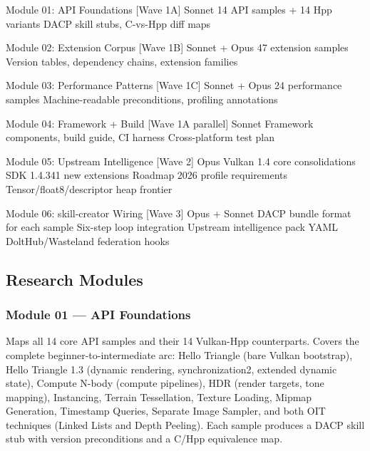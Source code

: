 \documentclass[11pt,letterpaper]{article}
\begin{document}
\begin{asciibox}
Module 01: API Foundations          [Wave 1A] Sonnet
  14 API samples + 14 Hpp variants
  DACP skill stubs, C-vs-Hpp diff maps

Module 02: Extension Corpus         [Wave 1B] Sonnet + Opus
  47 extension samples
  Version tables, dependency chains, extension families

Module 03: Performance Patterns     [Wave 1C] Sonnet + Opus
  24 performance samples
  Machine-readable preconditions, profiling annotations

Module 04: Framework + Build        [Wave 1A parallel] Sonnet
  Framework components, build guide, CI harness
  Cross-platform test plan

Module 05: Upstream Intelligence    [Wave 2] Opus
  Vulkan 1.4 core consolidations
  SDK 1.4.341 new extensions
  Roadmap 2026 profile requirements
  Tensor/float8/descriptor heap frontier

Module 06: skill-creator Wiring     [Wave 3] Opus + Sonnet
  DACP bundle format for each sample
  Six-step loop integration
  Upstream intelligence pack YAML
  DoltHub/Wasteland federation hooks
\end{asciibox}

\subsection{Research Modules}

\subsubsection{Module 01 --- API Foundations}
Maps all 14 core API samples and their 14 Vulkan-Hpp counterparts. Covers the complete beginner-to-intermediate arc: Hello Triangle (bare Vulkan bootstrap), Hello Triangle 1.3 (dynamic rendering, synchronization2, extended dynamic state), Compute N-body (compute pipelines), HDR (render targets, tone mapping), Instancing, Terrain Tessellation, Texture Loading, Mipmap Generation, Timestamp Queries, Separate Image Sampler, and both OIT techniques (Linked Lists and Depth Peeling). Each sample produces a DACP skill stub with version preconditions and a C/Hpp equivalence map.
\end{document}
